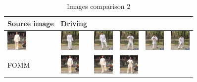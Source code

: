 \documentclass{article}
\begin{document}
\begin{table}[t]
\caption{Images comparison 2}
\label{table:images 2}
\vskip 0.15in
\begin{center}
\begin{small}
\begin{sc}
\begin{tabular}{m{1.0cm}m{1.0cm}m{1.0cm}m{1.0cm}m{1.0cm}m{1.0cm}}
\toprule
Source image & Driving\\
\toprule
\includegraphics[width=1cm, height=1cm]{images/intro_image/source.png} &
\includegraphics[width=1cm, height=1cm]{images/intro_image/Driving_1.png} &
\includegraphics[width=1cm, height=1cm]{images/intro_image/Driving_2.png} &
\includegraphics[width=1cm, height=1cm]{images/intro_image/Driving_4.png} &
\includegraphics[width=1cm, height=1cm]{images/intro_image/Driving_5.png} &
\includegraphics[width=1cm, height=1cm]{images/intro_image/Driving_6.png} \\
\midrule
FOMM & \includegraphics[width=1cm, height=1cm]{images/intro_image/animate_1_fomm.png} &
\includegraphics[width=1cm, height=1cm]{images/intro_image/animate_2_fomm.png} &
\includegraphics[width=1cm, height=1cm]{images/intro_image/animate_4_fomm.png} &

\end{tabular}
\end{sc}
\end{small}
\end{center}
\end{table}
\end{document}
